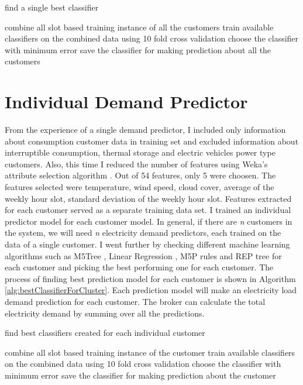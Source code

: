 \begin{algorithm}[!h]
\caption{find a single best classifier}
\begin{algorithmic} [1]
\STATE combine all slot based training instance of all the customers
\STATE train available classifiers on the combined data using 10 fold cross validation
\STATE choose the classifier with minimum error
\STATE save the classifier for making prediction about all the customers
\end{algorithmic}
\label{alg:bestSingle}
\end{algorithm}

\section{Individual Demand Predictor}

From the experience of a single demand predictor, I included only information about consumption customer data in training set and excluded information about interruptible consumption, thermal storage and electric vehicles power type customers. Also, this time I reduced the number of features using Weka's attribute selection algorithm \cite{witten2005data}. Out of 54 features, only 5 were choosen. The features selected were temperature, wind speed, cloud cover, average of the weekly hour slot, standard deviation of the weekly hour slot. Features extracted for each customer served as a separate training data set. I trained an individual predictor model for each customer model. In general, if there are \textit{n} customers in the system, we will need \textit{n} electricity demand predictors, each trained on the data of a single customer. I went further by checking different machine learning algorithms such as M5Tree \cite{witten2005data}, Linear Regression \cite{witten2005data}, M5P rules \cite{witten2005data} and REP tree \cite{witten2005data} for each customer and picking the best performing one for each customer. The process of finding best prediction model for each customer is shown in Algorithm \ref{alg:bestClassifierForCluster}. Each prediction model will make an electricity load demand prediction for each customer. The broker can calculate the total electricity demand by summing over all the predictions.

\begin{algorithm}[!h]
\caption{find best classifiers created for each individual customer}
\begin{algorithmic} [1]
    \STATE combine all slot based training instance of the customer
    \STATE train available classifiers on the combined data using 10 fold cross validation
    \STATE choose the classifier with minimum error
    \STATE save the classifier for making prediction about the customer
\ENDFOR 
\end{algorithmic}
\label{alg:bestClassifierIndiv}
\end{algorithm}



